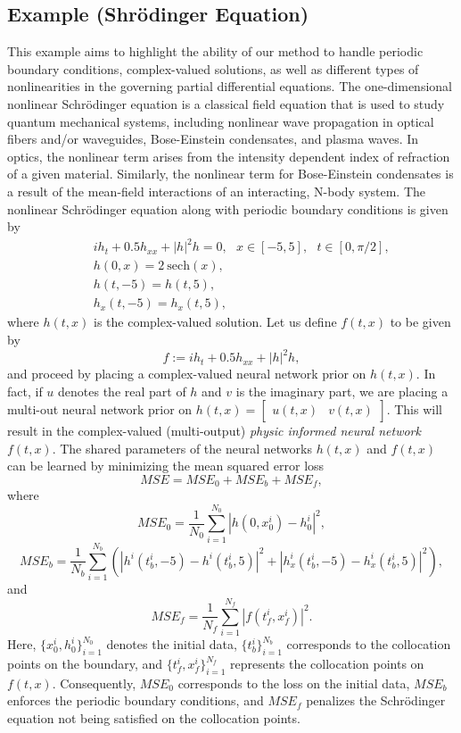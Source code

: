 
\subsection{Example (Shr\"{o}dinger Equation)} \label{sec:schrodinger_CT}
This example aims to highlight the ability of our method to handle periodic boundary conditions, complex-valued solutions, as well as different types of nonlinearities in the governing partial differential equations. The one-dimensional nonlinear Schr\"{o}dinger equation is a classical field equation that is used to study quantum mechanical systems, including nonlinear wave propagation in optical fibers and/or waveguides, Bose-Einstein condensates, and plasma waves. In optics, the nonlinear term arises from the intensity dependent index of refraction of a given material. Similarly, the nonlinear term for Bose-Einstein condensates is a result of the mean-field interactions of an interacting, N-body system. The nonlinear Schr\"{o}dinger equation along with periodic boundary conditions is given by
\begin{eqnarray}\label{eq:Schrodinger}
&& i h_t + 0.5 h_{xx} + |h|^2 h = 0,\ \ \ x \in [-5, 5],\ \ \ t \in [0, \pi/2],\\
&& h(0,x) = 2\ \text{sech}(x),\nonumber\\
&& h(t,-5) = h(t, 5),\nonumber\\
&& h_x(t,-5) = h_x(t, 5),\nonumber
\end{eqnarray}
where $h(t,x)$ is the complex-valued solution. Let us define $f(t,x)$ to be given by
\[
f := i h_t + 0.5 h_{xx} + |h|^2 h,
\]
and proceed by placing a complex-valued neural network prior on $h(t,x)$. In fact, if $u$ denotes the real part of $h$ and $v$ is the imaginary part, we are placing a multi-out neural network prior on $h(t,x) = \begin{bmatrix}
u(t,x) & v(t,x)
\end{bmatrix}$. This will result in the complex-valued (multi-output) \emph{physic informed neural network} $f(t,x)$. The shared parameters of the neural networks $h(t,x)$ and $f(t,x)$ can be learned by minimizing the mean squared error loss
\begin{equation}\label{eq:MSE_Schrodinger}
MSE = MSE_0 + MSE_b + MSE_f,
\end{equation}
where
\[
MSE_0 = \frac{1}{N_0}\sum_{i=1}^{N_0} |h(0,x_0^i) - h^i_0|^2,
\]
\[
MSE_b = \frac{1}{N_b}\sum_{i=1}^{N_b} \left(|h^i(t^i_b,-5) - h^i(t^i_b,5)|^2 + |h^i_x(t^i_b,-5) - h^i_x(t^i_b,5)|^2\right),
\]
and
\[
MSE_f = \frac{1}{N_f}\sum_{i=1}^{N_f}|f(t_f^i,x_f^i)|^2.
\]
Here, $\{x_0^i, h^i_0\}_{i=1}^{N_0}$ denotes the initial data, $\{t^i_b\}_{i=1}^{N_b}$ corresponds to the collocation points on the boundary, and $\{t_f^i,x_f^i\}_{i=1}^{N_f}$ represents the collocation points on $f(t,x)$. Consequently, $MSE_0$ corresponds to the loss on the initial data, $MSE_b$ enforces the periodic boundary conditions, and $MSE_f$ penalizes the Schr\"{o}dinger equation not being satisfied on the collocation points.\\

